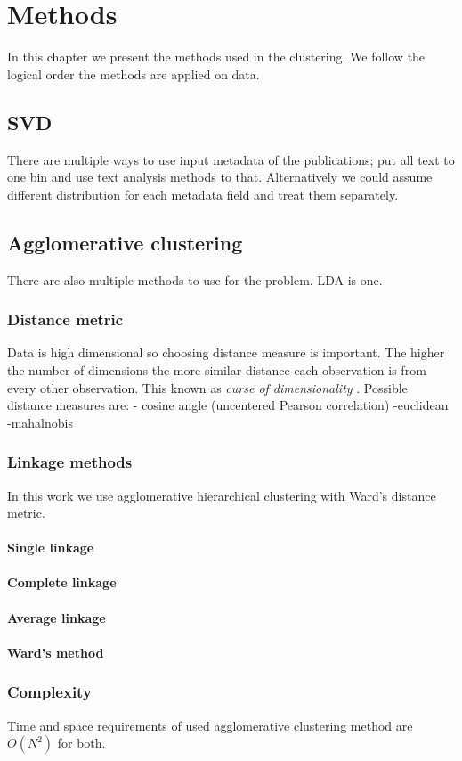 \chapter{Methods}
\label{chapter:methods}
In this chapter we present the methods used in the clustering. We 
follow the logical order the methods are applied on data.

\section{SVD}
\label{sec:svd}
There are multiple ways to use input metadata of the publications; 
put all text to one bin and use text analysis methods to that. 
Alternatively we could assume different distribution for each 
metadata field and treat them separately.

\section{Agglomerative clustering}
\label{sec:agglomerativeclustering}
There are also multiple methods to use for the problem. LDA is one.

\subsection{Distance metric}
Data is high dimensional so choosing distance measure is 
important. The higher the number of dimensions the more similar 
distance each observation is from every other observation. This 
known as \emph{curse of dimensionality} .
Possible distance measures are:
- cosine angle (uncentered Pearson correlation)
-euclidean
-mahalnobis

\subsection{Linkage methods}
In this work we use agglomerative hierarchical clustering with 
Ward's distance metric.

\subsubsection{Single linkage}
\subsubsection{Complete linkage}
\subsubsection{Average linkage}
\subsubsection{Ward's method}

\subsection{Complexity}
Time and space requirements of used agglomerative clustering method
are $O(N^2)$ for both.



